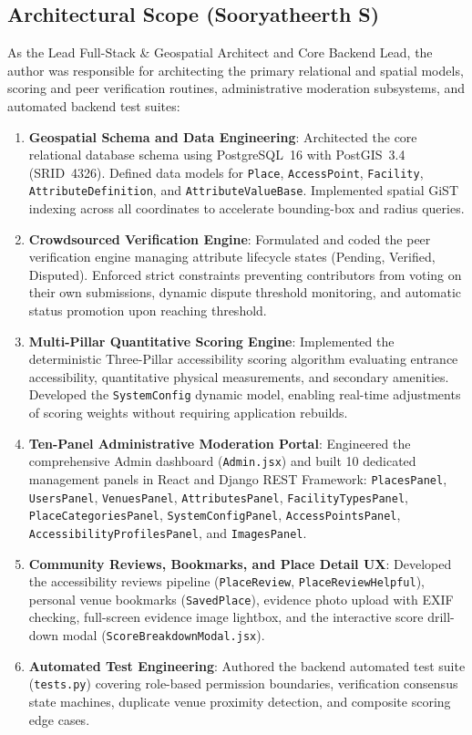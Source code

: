 \documentclass[12pt,a4paper]{report}
\begin{document}
\subsection{Architectural Scope (Sooryatheerth S)}
As the Lead Full-Stack \& Geospatial Architect and Core Backend Lead, the author was responsible for architecting the primary relational and spatial models, scoring and peer verification routines, administrative moderation subsystems, and automated backend test suites:
\begin{enumerate}
    \item \textbf{Geospatial Schema and Data Engineering}: Architected the core relational database schema using PostgreSQL~16 with PostGIS~3.4 (SRID~4326). Defined data models for \texttt{Place}, \texttt{AccessPoint}, \texttt{Facility}, \texttt{AttributeDefinition}, and \texttt{AttributeValueBase}. Implemented spatial GiST indexing across all coordinates to accelerate bounding-box and radius queries.
    \item \textbf{Crowdsourced Verification Engine}: Formulated and coded the peer verification engine managing attribute lifecycle states (Pending, Verified, Disputed). Enforced strict constraints preventing contributors from voting on their own submissions, dynamic dispute threshold monitoring, and automatic status promotion upon reaching threshold.
    \item \textbf{Multi-Pillar Quantitative Scoring Engine}: Implemented the deterministic Three-Pillar accessibility scoring algorithm evaluating entrance accessibility, quantitative physical measurements, and secondary amenities. Developed the \texttt{SystemConfig} dynamic model, enabling real-time adjustments of scoring weights without requiring application rebuilds.
    \item \textbf{Ten-Panel Administrative Moderation Portal}: Engineered the comprehensive Admin dashboard (\texttt{Admin.jsx}) and built 10 dedicated management panels in React and Django REST Framework: \texttt{PlacesPanel}, \texttt{UsersPanel}, \texttt{VenuesPanel}, \texttt{AttributesPanel}, \texttt{FacilityTypesPanel}, \texttt{PlaceCategoriesPanel}, \texttt{SystemConfigPanel}, \texttt{AccessPointsPanel}, \texttt{AccessibilityProfilesPanel}, and \texttt{ImagesPanel}.
    \item \textbf{Community Reviews, Bookmarks, and Place Detail UX}: Developed the accessibility reviews pipeline (\texttt{PlaceReview}, \texttt{PlaceReviewHelpful}), personal venue bookmarks (\texttt{SavedPlace}), evidence photo upload with EXIF checking, full-screen evidence image lightbox, and the interactive score drill-down modal (\texttt{ScoreBreakdownModal.jsx}).
    \item \textbf{Automated Test Engineering}: Authored the backend automated test suite (\texttt{tests.py}) covering role-based permission boundaries, verification consensus state machines, duplicate venue proximity detection, and composite scoring edge cases.
\end{enumerate}
\end{document}
